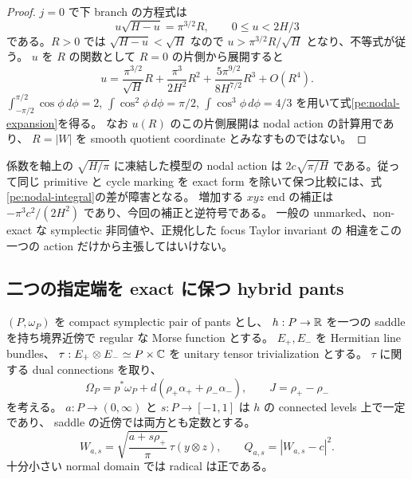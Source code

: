 \begin{proof}
$j=0$ で下 branch の方程式は
\[
 u\sqrt{H-u}=\pi^{3/2}R,\qquad 0\le u<2H/3
\]
である。$R>0$ では $\sqrt{H-u}<\sqrt H$ なので
$u>\pi^{3/2}R/\sqrt H$ となり、不等式が従う。
$u$ を $R$ の関数として $R=0$ の片側から展開すると
\[
 u=\frac{\pi^{3/2}}{\sqrt H}R
 +\frac{\pi^3}{2H^2}R^2
 +\frac{5\pi^{9/2}}{8H^{7/2}}R^3+O(R^4).
\]
$\int_{-\pi/2}^{\pi/2}\cos\phi\,d\phi=2$,
$\int\cos^2\phi\,d\phi=\pi/2$,
$\int\cos^3\phi\,d\phi=4/3$ を用いて式\eqref{pe:nodal-expansion}を得る。
なお $u(R)$ のこの片側展開は nodal action の計算用であり、
$R=|W|$ を smooth quotient coordinate とみなすものではない。
\end{proof}

係数を軸上の $\sqrt{H/\pi}$ に凍結した模型の nodal action は
$2c\sqrt{\pi/H}$ である。従って同じ primitive と cycle marking を
exact form を除いて保つ比較には、式\eqref{pe:nodal-integral}の差が障害となる。
増加する $xyz$ end の補正は $-\pi^3c^2/(2H^2)$ であり、今回の補正と逆符号である。
一般の unmarked、non-exact な symplectic 非同値や、正規化した focus Taylor invariant の
相違をこの一つの action だけから主張してはいけない。

\subsection{二つの指定端を exact に保つ hybrid pants}

$(P,\omega_P)$ を compact symplectic pair of pants とし、
$h:P\to\mathbb R$ を一つの saddle を持ち境界近傍で regular な Morse function とする。
$E_+,E_-$ を Hermitian line bundles、
$\tau:E_+\otimes E_-\simeq P\times\mathbb C$ を unitary tensor trivialization とする。
$\tau$ に関する dual connections を取り、
\[
 \Omega_P=p^*\omega_P+d(\rho_+\alpha_++\rho_-\alpha_-),
 \qquad J=\rho_+-\rho_-
\]
を考える。
$a:P\to(0,\infty)$ と $s:P\to[-1,1]$ は $h$ の connected levels 上で一定であり、
saddle の近傍では両方とも定数とする。
\begin{equation}\label{pe:hybrid}
 W_{a,s}=\sqrt{\frac{a+s\rho_+}{\pi}}\,\tau(y\otimes z),
 \qquad Q_{a,s}=|W_{a,s}-c|^2.
\end{equation}
十分小さい normal domain では radical は正である。

